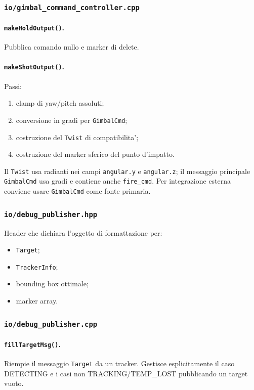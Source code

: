 \documentclass[11pt,a4paper]{article}
\newcommand{\code}[1]{\texttt{#1}}
\begin{document}
\subsubsection{\code{io/gimbal\_command\_controller.cpp}}

\paragraph{\code{makeHoldOutput()}.}
Pubblica comando nullo e marker di delete.

\paragraph{\code{makeShotOutput()}.}
Passi:
\begin{enumerate}[leftmargin=1.4em]
  \item clamp di yaw/pitch assoluti;
  \item conversione in gradi per \code{GimbalCmd};
  \item costruzione del \code{Twist} di compatibilita';
  \item costruzione del marker sferico del punto d'impatto.
\end{enumerate}

Il \code{Twist} usa radianti nei campi \code{angular.y} e \code{angular.z}; il messaggio principale \code{GimbalCmd} usa gradi e contiene anche \code{fire\_cmd}. Per integrazione esterna conviene usare \code{GimbalCmd} come fonte primaria.

\subsubsection{\code{io/debug\_publisher.hpp}}

Header che dichiara l'oggetto di formattazione per:
\begin{itemize}[leftmargin=1.4em]
  \item \code{Target};
  \item \code{TrackerInfo};
  \item bounding box ottimale;
  \item marker array.
\end{itemize}

\subsubsection{\code{io/debug\_publisher.cpp}}

\paragraph{\code{fillTargetMsg()}.}
Riempie il messaggio \code{Target} da un tracker. Gestisce esplicitamente il caso DETECTING e i casi non TRACKING/TEMP\_LOST pubblicando un target vuoto.
\end{document}
